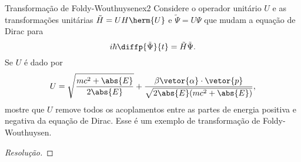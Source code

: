 \begin{exercício}{Transformação de Foldy-Wouthuysen}{ex2}
    Considere o operador unitário \(U\) e as transformações unitárias \(\tilde{H} = UH \herm{U}\) e \(\tilde{\Psi} = U\Psi\) que mudam a equação de Dirac para
    \begin{equation*}
        i\hbar \diffp{\tilde{\Psi}}{t} = \tilde{H} \tilde{\Psi}.
    \end{equation*}
    Se \(U\) é dado por
    \begin{equation*}
        U = \sqrt{\frac{mc^2 + \abs{E}}{2\abs{E}}} + \frac{\beta \vetor{\alpha}\cdot \vetor{p}}{\sqrt{2\abs{E}(mc^2 + \abs{E})}},
    \end{equation*}
    mostre que \(U\) remove todos os acoplamentos entre as partes de energia positiva e negativa da equação de Dirac. Esse é um exemplo de transformação de Foldy-Wouthuysen.
\end{exercício}
\begin{proof}[Resolução]
    
\end{proof}
